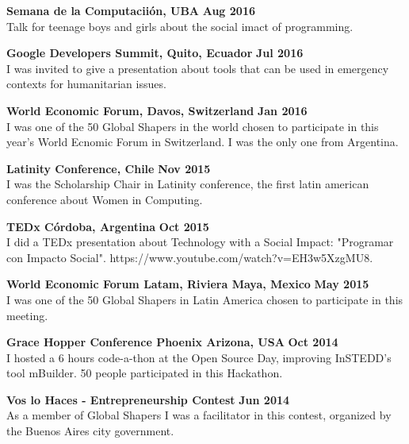 \documentclass[margin,line]{resume}
\begin{document}
\begin{resume}
\textbf{Semana de la Computacii\'on, UBA} \hfill \textbf{Aug 2016} \vspace{2mm} \\
Talk for teenage boys and girls about the social imact of programming.

\textbf{Google Developers Summit, Quito, Ecuador} \hfill \textbf{Jul 2016} \vspace{2mm} \\
I was invited to give a presentation about tools that can be used in emergency contexts for humanitarian issues.

\textbf{World Economic Forum, Davos, Switzerland} \hfill \textbf{Jan 2016} \vspace{2mm} \\
I was one of the 50 Global Shapers in the world chosen to participate in this year's World Ecnomic Forum in Switzerland. I was the only one from Argentina.

\textbf{Latinity Conference, Chile} \hfill \textbf{Nov 2015} \vspace{2mm} \\
I was the Scholarship Chair in Latinity conference, the first latin american conference about Women in Computing.

\textbf{TEDx C\'ordoba, Argentina} \hfill \textbf{Oct 2015} \vspace{2mm} \\
I did a TEDx presentation about Technology with a Social Impact: "Programar con Impacto Social". https://www.youtube.com/watch?v=EH3w5XzgMU8.

\textbf{World Economic Forum Latam, Riviera Maya, Mexico} \hfill \textbf{May 2015} \vspace{2mm} \\
I was one of the 50 Global Shapers in Latin America chosen to participate in this meeting.

\textbf{Grace Hopper Conference Phoenix Arizona, USA} \hfill \textbf{Oct 2014} \vspace{2mm} \\
I hosted a 6 hours code-a-thon at the Open Source Day, improving InSTEDD's tool mBuilder. 50 people participated in this Hackathon. 

\textbf{Vos lo Haces - Entrepreneurship Contest} \hfill \textbf{Jun 2014} \vspace{2mm} \\
As a member of Global Shapers I was a facilitator in this contest, organized by the Buenos Aires city government.
 

\end{resume}
\end{document}
